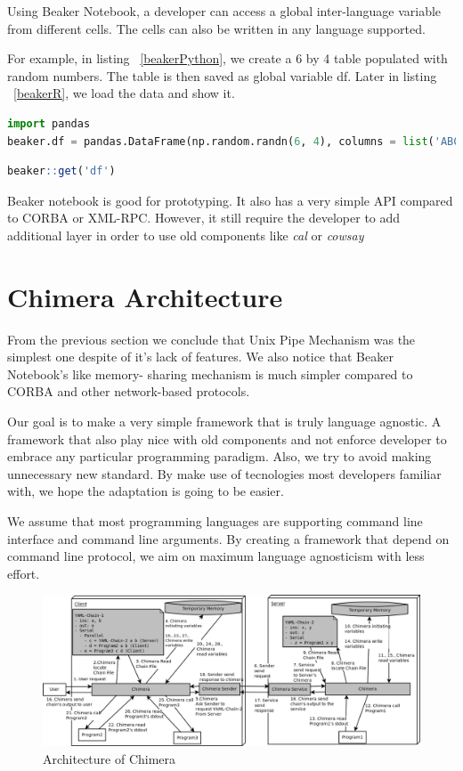 \documentclass[conference]{IEEEtran}
\begin{document}
Using Beaker Notebook, a developer can access a global inter-language variable
from different cells. The cells can also be written in any language supported.

For example, in listing ~\ref{beakerPython}, we create a 6 by 4 table populated with
random numbers. The table is then saved as global variable df. 
Later in listing ~\ref{beakerR}, we load the data and show it.

\begin{lstlisting}[caption=Beaker Python Cell Example, label=beakerPython, language=python, basicstyle=\small, breaklines=true]
import pandas
beaker.df = pandas.DataFrame(np.random.randn(6, 4), columns = list('ABCD'))
\end{lstlisting}

\begin{lstlisting}[caption=Beaker R Cell Example, label=beakerR, language=R, basicstyle=\small, breaklines=true]
beaker::get('df')
\end{lstlisting}

Beaker notebook is good for prototyping. It also has a very simple API compared to
CORBA or XML-RPC. However, it still require the developer to add additional layer
in order to use old components like {\it cal} or {\it cowsay}


\section{Chimera Architecture}

From the previous section we conclude that Unix Pipe Mechanism was the simplest one
despite of it's lack of features. We also notice that Beaker Notebook's like memory-
sharing mechanism is much simpler compared to CORBA and other network-based protocols.

Our goal is to make a very simple framework that is truly language agnostic. A framework
that also play nice with old components and not enforce developer to embrace any 
particular programming paradigm. Also, we try to avoid making unnecessary new standard.
By make use of tecnologies most developers familiar with, we hope the adaptation is
going to be easier.

We assume that most programming languages are supporting command line interface and
command line arguments. By creating a framework that depend on command line protocol,
we aim on maximum language agnosticism with less effort.

\begin{figure}
	\centering
	\includegraphics[width=1.0\textwidth]
		{images/chimera.png}
	\caption{Architecture of Chimera}
	\label{fig:chimeraArchitecture}
\end{figure}
\end{document}
